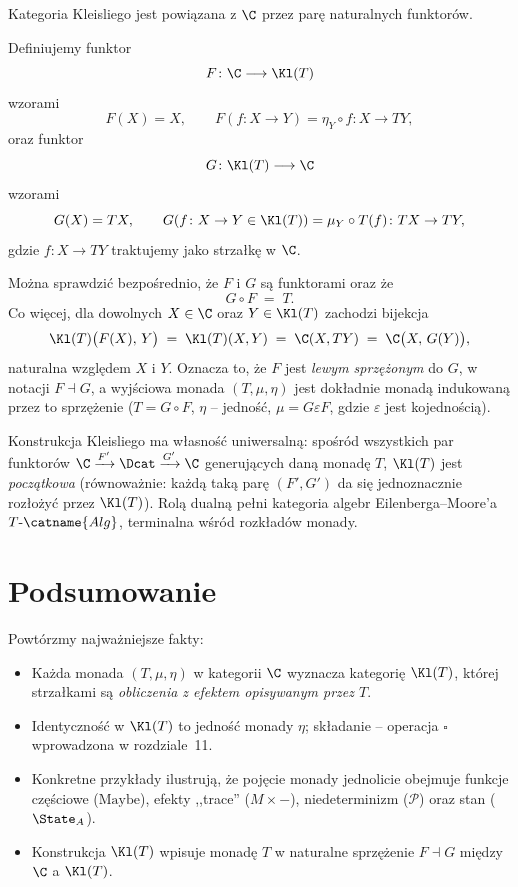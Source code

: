 Kategoria Kleisliego jest powiązana z $\C$ przez parę naturalnych funktorów.

\begin{definicja}
Definiujemy funktor
\[
F\colon \C\longrightarrow \Kl(T)
\]
wzorami
\[
F(X) = X, \qquad F(f\colon X\to Y) = \eta_Y\circ f\colon X\to TY,
\]
oraz funktor
\[
G\colon \Kl(T)\longrightarrow \C
\]
wzorami
\[
G(X) = TX, \qquad G(f\colon X\to Y \in \Kl(T)) = \mu_Y\circ T(f)\colon TX\to TY,
\]
gdzie $f\colon X\to TY$ traktujemy jako strzałkę w $\C$.
\end{definicja}

\begin{uwaga}
Można sprawdzić bezpośrednio, że $F$ i $G$ są funktorami oraz że
\[
G\circ F \;=\; T.
\]
Co więcej, dla dowolnych $X\in\C$ oraz $Y\in\Kl(T)$ zachodzi bijekcja
\[
\Kl(T)\bigl(F(X),\, Y\bigr) \;=\; \Kl(T)(X,Y) \;=\; \C(X,TY) \;=\; \C\bigl(X,\, G(Y)\bigr),
\]
naturalna względem $X$ i $Y$. Oznacza to, że $F$ jest \emph{lewym sprzężonym} do $G$, w notacji $F\dashv G$, a wyjściowa monada $(T,\mu,\eta)$ jest dokładnie monadą indukowaną przez to sprzężenie ($T = G\circ F$, $\eta$ -- jedność, $\mu = G\varepsilon F$, gdzie $\varepsilon$ jest kojednością).
\end{uwaga}

\begin{uwaga}
Konstrukcja Kleisliego ma własność uniwersalną: spośród wszystkich par funktorów $\C\xrightarrow{F'} \Dcat \xrightarrow{G'} \C$ generujących daną monadę $T$, $\Kl(T)$ jest \emph{początkowa} (równoważnie: każdą taką parę $(F',G')$ da się jednoznacznie rozłożyć przez $\Kl(T)$). Rolą dualną pełni kategoria algebr Eilenberga--Moore'a $T\text{-}\catname{Alg}$, terminalna wśród rozkładów monady.
\end{uwaga}

\section{Podsumowanie}

Powtórzmy najważniejsze fakty:

\begin{itemize}[leftmargin=*]
\item Każda monada $(T,\mu,\eta)$ w kategorii $\C$ wyznacza kategorię $\Kl(T)$, której strzałkami są \emph{obliczenia z efektem opisywanym przez $T$}.
\item Identyczność w $\Kl(T)$ to jedność monady $\eta$; składanie -- operacja $\square$ wprowadzona w rozdziale~11.
\item Konkretne przykłady ilustrują, że pojęcie monady jednolicie obejmuje funkcje częściowe ($\mathrm{Maybe}$), efekty ,,trace'' ($M\times{-}$), niedeterminizm ($\mathcal{P}$) oraz stan ($\State_A$).
\item Konstrukcja $\Kl(T)$ wpisuje monadę $T$ w naturalne sprzężenie $F\dashv G$ między $\C$ a $\Kl(T)$.
\end{itemize}

